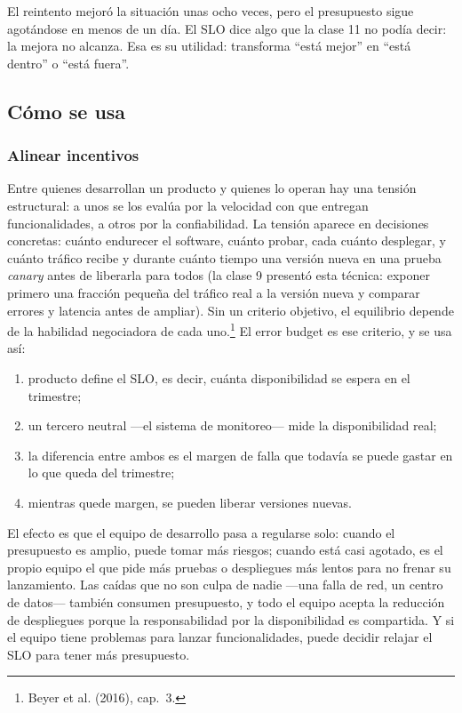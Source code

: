 \documentclass[variant=apuntes,cover=institutional,mode=screen]{ua-engineering-v6-article}
\begin{document}
El reintento mejoró la situación unas ocho veces, pero el presupuesto sigue agotándose en menos de un día. El SLO dice algo que la clase 11 no podía decir: la mejora no alcanza. Esa es su utilidad: transforma ``está mejor'' en ``está dentro'' o ``está fuera''.

\subsection{Cómo se usa}

\subsubsection{Alinear incentivos}

Entre quienes desarrollan un producto y quienes lo operan hay una tensión estructural: a unos se los evalúa por la velocidad con que entregan funcionalidades, a otros por la confiabilidad. La tensión aparece en decisiones concretas: cuánto endurecer el software, cuánto probar, cada cuánto desplegar, y cuánto tráfico recibe y durante cuánto tiempo una versión nueva en una prueba \emph{canary} antes de liberarla para todos (la clase 9 presentó esta técnica: exponer primero una fracción pequeña del tráfico real a la versión nueva y comparar errores y latencia antes de ampliar). Sin un criterio objetivo, el equilibrio depende de la habilidad negociadora de cada uno.\footnote{Beyer et al. (2016), cap.~3.} El error budget es ese criterio, y se usa así:
\begin{enumerate}
\item producto define el SLO, es decir, cuánta disponibilidad se espera en el trimestre;
\item un tercero neutral ---el sistema de monitoreo--- mide la disponibilidad real;
\item la diferencia entre ambos es el margen de falla que todavía se puede gastar en lo que queda del trimestre;
\item mientras quede margen, se pueden liberar versiones nuevas.
\end{enumerate}

El efecto es que el equipo de desarrollo pasa a regularse solo: cuando el presupuesto es amplio, puede tomar más riesgos; cuando está casi agotado, es el propio equipo el que pide más pruebas o despliegues más lentos para no frenar su lanzamiento. Las caídas que no son culpa de nadie ---una falla de red, un centro de datos--- también consumen presupuesto, y todo el equipo acepta la reducción de despliegues porque la responsabilidad por la disponibilidad es compartida. Y si el equipo tiene problemas para lanzar funcionalidades, puede decidir relajar el SLO para tener más presupuesto.
\end{document}
